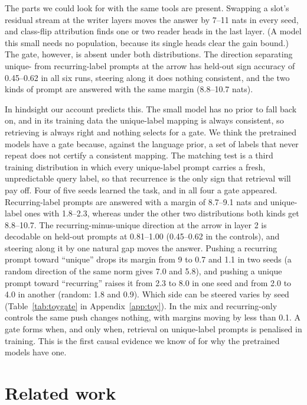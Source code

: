 \documentclass{article}
\begin{document}
The parts we could look for with the same tools are present. Swapping a slot's residual stream at the writer layers moves the answer by 7--11 nats in every seed, and class-flip attribution finds one or two reader heads in the last layer. (A model this small needs no population, because its single heads clear the gain bound.) The gate, however, is absent under both distributions. The direction separating unique- from recurring-label prompts at the arrow has held-out sign accuracy of 0.45--0.62 in all six runs, steering along it does nothing consistent, and the two kinds of prompt are answered with the same margin (8.8--10.7 nats).

In hindsight our account predicts this. The small model has no prior to fall back on, and in its training data the unique-label mapping is always consistent, so retrieving is always right and nothing selects for a gate. We think the pretrained models have a gate because, against the language prior, a set of labels that never repeat does not certify a consistent mapping. The matching test is a third training distribution in which every unique-label prompt carries a fresh, unpredictable query label, so that recurrence is the only sign that retrieval will pay off. Four of five seeds learned the task, and in all four a gate appeared. Recurring-label prompts are answered with a margin of 8.7--9.1 nats and unique-label ones with 1.8--2.3, whereas under the other two distributions both kinds get 8.8--10.7. The recurring-minus-unique direction at the arrow in layer 2 is decodable on held-out prompts at 0.81--1.00 (0.45--0.62 in the controls), and steering along it by one natural gap moves the answer. Pushing a recurring prompt toward ``unique'' drops its margin from 9 to 0.7 and 1.1 in two seeds (a random direction of the same norm gives 7.0 and 5.8), and pushing a unique prompt toward ``recurring'' raises it from 2.3 to 8.0 in one seed and from 2.0 to 4.0 in another (random: 1.8 and 0.9). Which side can be steered varies by seed (Table~\ref{tab:toygate} in Appendix~\ref{app:toy}). In the mix and recurring-only controls the same push changes nothing, with margins moving by less than 0.1. A gate forms when, and only when, retrieval on unique-label prompts is penalised in training. This is the first causal evidence we know of for why the pretrained models have one.

\section{Related work}\label{sec:related}
\end{document}
